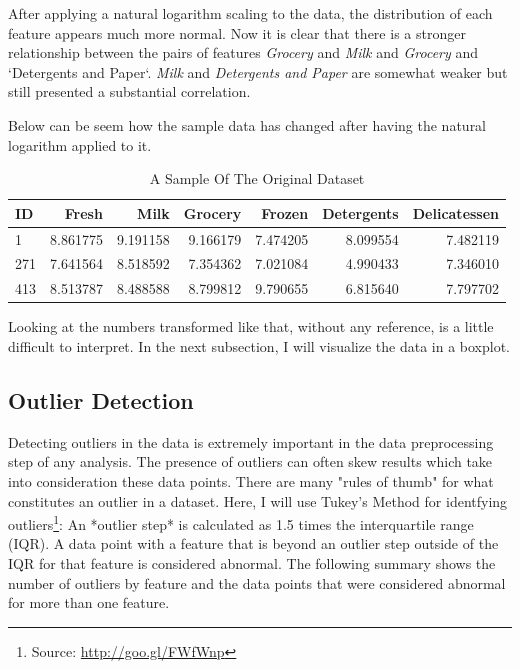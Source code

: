 \documentclass[a4paper]{article}
\begin{document}
After applying a natural logarithm scaling to the data, the distribution of each feature appears much more normal. Now it is clear that there is a stronger relationship between the pairs of features \textit{Grocery} and \textit{Milk} and \textit{Grocery} and `Detergents and Paper`. \textit{Milk} and \textit{Detergents and Paper} are somewhat weaker but still presented a substantial correlation.

Below can be seem how the sample data has changed after having the natural logarithm applied to it.

\begin{table}[ht!]
\centering
\begin{tabular}{l|rrrrrr}
{ID} &    Fresh &     Milk &  Grocery &    Frozen & Detergents & Delicatessen \\\hline
1   &  8.861775 &  9.191158 &  9.166179 &  7.474205 &          8.099554 &      7.482119 \\
271 &  7.641564 &  8.518592 &  7.354362 &  7.021084 &          4.990433 &      7.346010 \\
413 &  8.513787 &  8.488588 &  8.799812 &  9.790655 &          6.815640 &      7.797702 \\

\end{tabular}
\caption{\label{tab:log_sample}A Sample Of The Original Dataset}
\end{table}

Looking at the numbers transformed like that, without any reference, is a little difficult to interpret. In the next subsection, I will visualize the data in a boxplot.


\subsection{Outlier Detection}

Detecting outliers in the data is extremely important in the data preprocessing step of any analysis. The presence of outliers can often skew results which take into consideration these data points. There are many "rules of thumb" for what constitutes an outlier in a dataset. Here, I will use Tukey's Method for identfying outliers\footnote{Source: \url{http://goo.gl/FWfWnp}}: An *outlier step* is calculated as 1.5 times the interquartile range (IQR). A data point with a feature that is beyond an outlier step outside of the IQR for that feature is considered abnormal. The following summary shows the number of outliers by feature and the data points that were considered abnormal for more than one feature.
\end{document}
